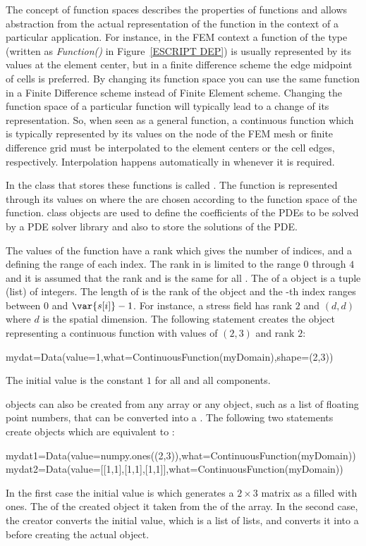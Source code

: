 The concept of function spaces describes the properties of 
functions and allows abstraction from the actual representation 
of the function in the context of a particular application. For instance, 
in the FEM context a
function of the \Function type (written as \emph{Function()} in Figure~\ref{ESCRIPT DEP})
is usually represented by its values at the element center, 
but in a finite difference scheme the edge midpoint of cells is preferred. 
By changing its function space you can use the same function in a Finite Difference
scheme instead of Finite Element scheme.
Changing the function space of a particular function
will typically lead to a change of its representation. 
So, when seen as a general function,
a continuous function which is typically represented by its values
on the node of the FEM mesh or finite difference grid 
must be interpolated to the element centers or the cell edges,
respectively. Interpolation happens automatically in \escript
whenever it is required.

In \escript the class that stores these functions is called \Data.
The function is represented through its values on \DataSamplePoints where
the \DataSamplePoints are chosen according to the function space 
of the function.  
\Data class objects are used to define the coefficients
of the PDEs to be solved by a PDE solver library 
and also to store the solutions of the PDE.

The values of the function have a rank which gives the
number of indices, and a \Shape defining the range of each index.
The rank in \escript is limited to the range $0$ through $4$ and
it is assumed that the rank and \Shape is the same for all \DataSamplePoints.
The \Shape of a \Data object is a tuple (list)  of integers. The length
of  is the rank of the \Data object and the -th index ranges between $0$ and $\var{s[i]}-1$.
For instance, a stress field has rank $2$ and 
\Shape $(d,d)$ where $d$ is the spatial dimension.
The following statement creates the \Data object
 representing a 
continuous function with values 
of \Shape $(2,3)$ and rank $2$:
\begin{python}
  mydat=Data(value=1,what=ContinuousFunction(myDomain),shape=(2,3))
\end{python}
The initial value is the constant $1$ for all \DataSamplePoints and
all components.

\Data objects can also be created from any \numpy
array or any object, such as a list of floating point numbers, 
that can be converted into a \numpyNDA \cite{NUMPY}. 
The following two statements
create objects which are equivalent to :
\begin{python}
  mydat1=Data(value=numpy.ones((2,3)),what=ContinuousFunction(myDomain))
  mydat2=Data(value=[[1,1],[1,1],[1,1]],what=ContinuousFunction(myDomain))
\end{python}
In the first case the initial value is 
which generates a $2 \times 3$ matrix as a \numpyNDA
filled with ones. The \Shape of the created \Data object
it taken from the \Shape of the array. In the second
case, the creator converts the initial value, which is a list of lists,
and converts it into a \numpyNDA before creating the actual
\Data object.      

